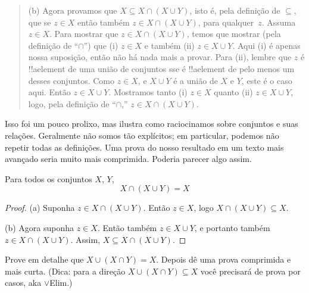 \documentclass[../../../include/open-logic-section]{subfiles}
\begin{document}
\begin{explain}
\begin{quote}
(b) Agora provamos que $X \subseteq X \cap (X \cup Y)$, isto é, pela
definição de $\subseteq$, que se $z \in X$ então também $z \in X \cap
(X \cup Y)$, para qualquer~$z$. Assuma $z \in X$. Para mostrar que $z \in X
\cap (X \cup Y)$, temos que mostrar (pela definição de ``$\cap$'') que
(i) $z \in X$ e também (ii) $z \in X \cup Y$. Aqui (i) é apenas nossa
suposição, então não há nada mais a provar. Para (ii), lembre que $z$
é !!a{element} de uma união de conjuntos sse é !!a{element} de pelo menos
um desses conjuntos. Como $z \in X$, e $X \cup Y$ é a união de
$X$ e $Y$, este é o caso aqui. Então $z \in X \cup Y$. Mostramos
tanto (i) $z \in X$ quanto (ii) $z \in X \cup Y$, logo, pela definição de
``$\cap$,'' $z \in X \cap (X \cup Y)$.
\end{quote}

Isso foi um pouco prolixo, mas ilustra como raciocinamos sobre
conjuntos e suas relações. Geralmente não somos tão explícitos; em
particular, podemos não repetir todas as definições. Uma prova do nosso
resultado em um texto mais avançado seria muito mais comprimida. Poderia
parecer algo assim.
\end{explain}


\begin{prop}[Absorção]
Para todos os conjuntos $X$, $Y$,
\[
X \cap (X \cup Y) = X
\]
\end{prop}

\begin{proof}
(a) Suponha $z \in X \cap (X \cup Y)$. Então $z \in X$, logo $X \cap (X
  \cup Y) \subseteq X$.

(b) Agora suponha $z \in X$. Então também $z \in X \cup Y$, e portanto
  também $z \in X \cap (X \cup Y)$. Assim, $X \subseteq X \cap (X \cup
  Y)$.
\end{proof}

\begin{prob}
Prove em detalhe que $X \cup (X \cap Y) = X$. Depois dê uma prova
comprimida e mais curta. (Dica: para a direção $X \cup (X \cap Y) \subseteq X$
você precisará de prova por casos, aka $\lor$Elim.)
\end{prob}
\end{document}
